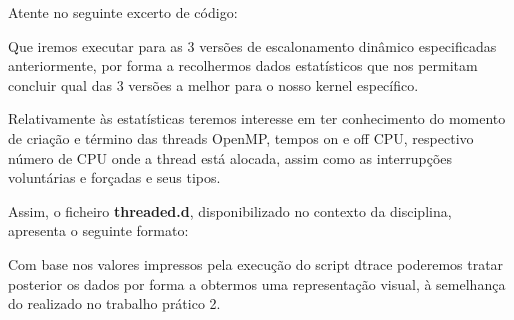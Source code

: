 \documentclass[a4paper]{article}
\begin{document}
Atente no seguinte excerto de código:

Que iremos executar para as 3 versões de escalonamento dinâmico especificadas anteriormente, por forma a recolhermos dados estatísticos que nos permitam concluir qual das 3 versões a melhor para o nosso kernel específico.\par
Relativamente às estatísticas teremos interesse em ter conhecimento do momento de criação e término das threads OpenMP, tempos on e off CPU, respectivo número de CPU onde a thread está alocada, assim como as interrupções voluntárias e forçadas e seus tipos.\par 
Assim, o ficheiro \textbf{threaded.d}, disponibilizado no contexto da disciplina, apresenta o seguinte formato:

  
  Com base nos valores impressos pela execução do script dtrace poderemos tratar posterior os dados por forma a obtermos uma representação visual, à semelhança do realizado no trabalho prático 2.
  
\end{document}
